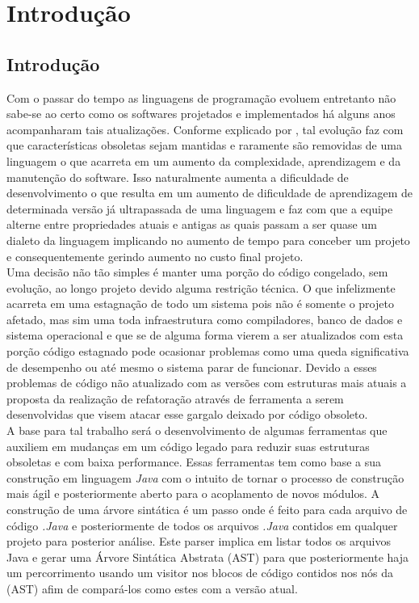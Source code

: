 \chapter{Introdução}
\section{Introdução}

Com o passar do tempo as linguagens de programação evoluem entretanto não sabe-se ao certo como os softwares projetados e implementados há alguns anos acompanharam tais atualizações\cite{dyer2013large}. Conforme explicado por \cite{Overbey:2009:RLR:1639949.1640127}, tal evolução faz com que características obsoletas sejam mantidas e raramente são removidas de uma linguagem o que acarreta em um aumento da complexidade, aprendizagem e da manutenção do software. Isso naturalmente aumenta a dificuldade de desenvolvimento o que resulta em um aumento de dificuldade de aprendizagem de determinada versão já ultrapassada de uma linguagem e faz com que a equipe alterne entre propriedades atuais e antigas as quais passam a ser quase um dialeto da linguagem implicando no aumento de tempo para conceber um projeto e consequentemente gerindo aumento no custo final projeto.\\

Uma decisão não tão simples é manter uma porção do código congelado, sem evolução, ao longo projeto devido alguma restrição técnica. O que infelizmente acarreta em uma estagnação de todo um sistema pois não é somente o projeto afetado, mas sim uma toda infraestrutura como compiladores, banco de dados e sistema operacional e que se de alguma forma vierem a ser atualizados com esta porção código estagnado pode ocasionar problemas como uma queda significativa de desempenho ou até mesmo o sistema parar de funcionar. Devido a esses problemas de código não atualizado com as versões com estruturas mais atuais a proposta da realização de refatoração através de ferramenta a serem desenvolvidas que visem atacar esse gargalo deixado por código obsoleto.\\

A base para tal trabalho será o desenvolvimento de algumas ferramentas que auxiliem em mudanças em um código legado para reduzir suas estruturas obsoletas e com baixa performance. Essas ferramentas tem como base a sua construção em linguagem {\it Java} com o intuito de tornar o processo de construção mais ágil e posteriormente aberto para o acoplamento de novos módulos. A construção de uma árvore sintática é um passo onde é feito para cada arquivo de código {\it .Java} e posteriormente de todos os arquivos {\it .Java} contidos em qualquer projeto para posterior análise. Este parser implica em listar todos os arquivos Java e gerar uma Árvore Sintática Abstrata (AST) para que posteriormente haja um percorrimento usando um visitor\cite{Gamma:1995:DPE:186897} nos blocos de código contidos nos nós da (AST)\cite{Dyer:2014:MBA:2568225.2568295} afim de compará-los como estes com a versão atual.\\

